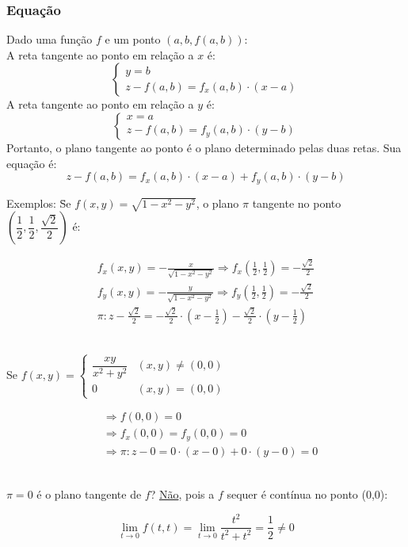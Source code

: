 \documentclass{article}
\begin{document}
\subsubsection{Equação}
Dado uma função $f$ e um ponto $(a, b, f(a,b))$:\\[5pt]
\indent A reta tangente ao ponto em relação a $x$ é:
\[ \begin{cases}
  y = b\\
  z - f(a,b) = f_x(a, b) \cdot (x - a)
\end{cases} \]
\indent A reta tangente ao ponto em relação a $y$ é:
\[ \begin{cases}
  x = a\\
  z - f(a,b) = f_y(a, b) \cdot (y - b)
\end{cases} \]
\indent Portanto, o plano tangente ao ponto é o plano determinado pelas duas retas. Sua equação é:
\[ z - f(a,b) = f_x(a, b) \cdot(x - a) + f_y(a, b) \cdot(y - b) \]
\vspace{-5pt}
\begin{tabbing}
  Exemplos: \=Se $f(x, y) = \sqrt{1 - x^2 - y^2}$, o plano $\pi$ tangente no ponto $\left(\dfrac{1}{2}, \dfrac{1}{2}, \dfrac{\sqrt{2}}{2}\right)$ é: \\
  \>\begin{minipage}{300pt}
    \begin{gather*}
      f_x(x, y) = - \frac{x}{\sqrt{1 - x^2 - y^2}} \Rightarrow f_x\left( \frac{1}{2}, \frac{1}{2} \right) = - \frac{\sqrt{2}}{2} \\
      f_y(x, y) = - \frac{y}{\sqrt{1 - x^2 - y^2}} \Rightarrow f_y\left( \frac{1}{2}, \frac{1}{2} \right) = - \frac{\sqrt{2}}{2} \\[10pt]
      \pi : z - \frac{\sqrt{2}}{2} = - \frac{\sqrt{2}}{2} \cdot \left( x - \frac{1}{2} \right) - \frac{\sqrt{2}}{2} \cdot \left( y - \frac{1}{2} \right)
    \end{gather*}
  \end{minipage}\\[20pt]
  \>Se $ f(x,y) = \begin{cases}
                    \dfrac{xy}{x^2 + y^2} & (x,y) \neq (0,0) \\[5pt]
                    0 & (x,y) = (0,0)
                  \end{cases} $ \\
  \>\begin{minipage}{270pt}
      \begin{align*}
        &\Rightarrow f(0,0) = 0 \\[5pt]
        &\Rightarrow f_x(0,0) = f_y(0,0) = 0 \\[5pt]
        &\Rightarrow \pi : z - 0 = 0 \cdot (x - 0) + 0 \cdot (y - 0) = 0
      \end{align*}
    \end{minipage} \\[5pt]
  \>\quad $\pi = 0$ é o plano tangente de $f$? \uline{Não}, pois a $f$ sequer é contínua no ponto (0,0):\\[5pt]
  \>\begin{minipage}{235pt}
    \[ \lim_{t \to 0} f(t, t) = \lim_{t \to 0} \frac{t^2}{t^2 + t^2} = \frac{1}{2} \neq 0 \]
  \end{minipage}
\end{tabbing}
\end{document}
